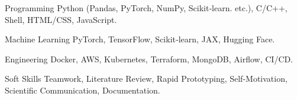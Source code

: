 

\begin{cvskills}

  \cvskill
    {Programming} %
    {Python (Pandas, PyTorch, NumPy, Scikit‑learn. etc.), C/C++, Shell, HTML/CSS, JavaScript.} %

  \cvskill
    {Machine Learning} %
    {PyTorch, TensorFlow, Scikit‑learn, JAX, Hugging Face.} %

  \cvskill
    {Engineering} %
    {Docker, AWS, Kubernetes, Terraform, MongoDB, Airflow, CI/CD.} %

  \cvskill
    {Soft Skills} %
    {Teamwork, Literature Review, Rapid Prototyping, Self-Motivation, Scientific Communication, Documentation.} %

\end{cvskills}
